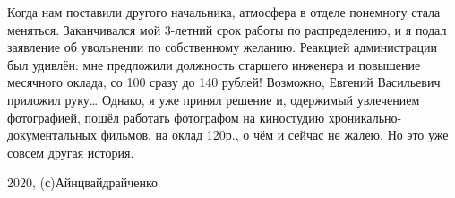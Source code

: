 Когда нам поставили другого начальника, атмосфера в отделе понемногу стала
меняться. Заканчивался мой 3-летний срок работы по распределению, и я подал
заявление об увольнении по собственному желанию. Реакцией администрации был
удивлён: мне предложили должность старшего инженера и повышение месячного
оклада, со 100 сразу до 140 рублей! Возможно, Евгений Васильевич приложил руку…
Однако, я уже принял решение и, одержимый увлечением фотографией, пошёл
работать фотографом на киностудию хроникально-документальных фильмов, на оклад
120р., о чём и сейчас не жалею. Но это уже совсем другая история.

2020, (с)Айнцвайдрайченко

